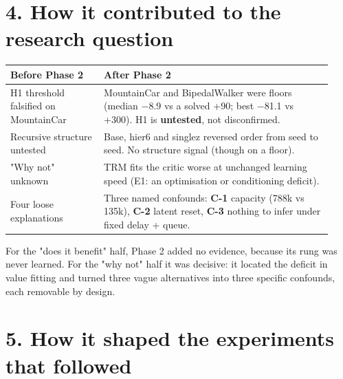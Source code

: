 \documentclass[11pt]{article}
\begin{document}
\section*{4. How it contributed to the research question}



\begin{center}\small\begin{tabular}{>{\raggedright\arraybackslash}p{0.273\linewidth}>{\raggedright\arraybackslash}p{0.661\linewidth}}
\toprule
Before Phase 2 & After Phase 2 \\
\midrule
H1 threshold falsified on MountainCar & MountainCar and BipedalWalker were floors (median $-$8.9 vs a solved +90; best $-$81.1 vs +300). H1 is \textbf{untested}, not disconfirmed. \\
Recursive structure untested & Base, hier6 and singlez reversed order from seed to seed. No structure signal (though on a floor). \\
"Why not" unknown & TRM fits the critic worse at unchanged learning speed (E1: an optimisation or conditioning deficit). \\
Four loose explanations & Three named confounds: \textbf{C-1} capacity (788k vs 135k), \textbf{C-2} latent reset, \textbf{C-3} nothing to infer under fixed delay + queue. \\
\bottomrule
\end{tabular}\end{center}



For the "does it benefit" half, Phase 2 added no evidence, because its rung was never learned. For the "why not" half it was decisive: it located the deficit in value fitting and turned three vague alternatives into three specific confounds, each removable by design.



\section*{5. How it shaped the experiments that followed}
\end{document}
